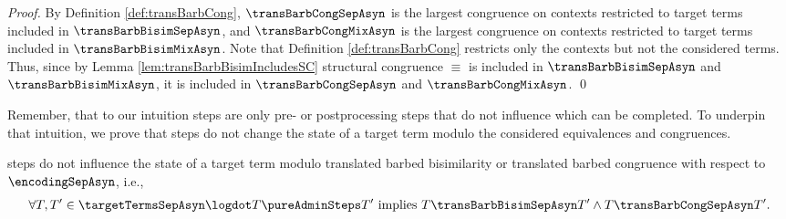 \documentclass[]{llncs}
\begin{document}
\begin{proof}
	By Definition \ref{def:transBarbCong}, $ \transBarbCongSepAsyn $ is the largest congruence on contexts restricted to target terms included in $ \transBarbBisimSepAsyn $, and $ \transBarbCongMixAsyn $ is the largest congruence on contexts restricted to target terms included in $ \transBarbBisimMixAsyn $. Note that Definition \ref{def:transBarbCong} restricts only the contexts but not the considered terms. Thus, since by Lemma \ref{lem:transBarbBisimIncludesSC} structural congruence $ \equiv $ is included in $ \transBarbBisimSepAsyn $ and $ \transBarbBisimMixAsyn $, it is included in $ \transBarbCongSepAsyn $ and $ \transBarbCongMixAsyn $.
	\qed
\end{proof}

Remember, that to our intuition \pure \admin steps are only pre- or postprocessing steps that do not influence which \simulations can be completed. To underpin that intuition, we prove that \pure \admin steps do not change the state of a target term modulo the considered equivalences and congruences.

\begin{lemma} \label{lem:pureAdminStepsTransBarbBisimSepAsyn}
	\Pure \admin steps do not influence the state of a target term modulo translated barbed bisimilarity or translated barbed congruence with respect to $ \encodingSepAsyn $, i.e.,
	\begin{align*}
		\forall T, T' \in \targetTermsSepAsyn \logdot T \pureAdminSteps T' \text{ implies } T \transBarbBisimSepAsyn T' \wedge T \transBarbCongSepAsyn T'.
	\end{align*}
\end{lemma}
\end{document}
